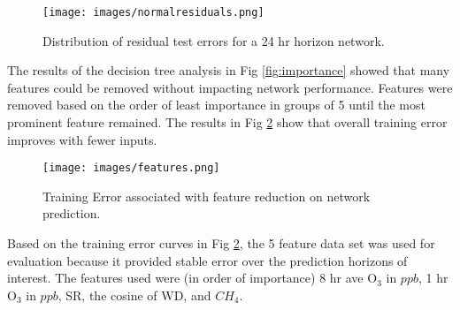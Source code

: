 %
\begin{figure}[!htb]
\centering
\texttt{[image: images/normalresiduals.png]}
\caption{Distribution of residual test errors for a 24 hr horizon network.}
\label{fig:normalresiduals}
\end{figure}
%

The results of the decision tree analysis in Fig \ref{fig:importance} showed that many features could be removed without impacting network performance. Features were removed based on the order of least importance in groups of 5 until the most prominent feature remained. The results in Fig \ref{fig:features} show that overall training error improves with fewer inputs.
%
\begin{figure}[!htb]
\centering
\texttt{[image: images/features.png]}
\caption{Training Error associated with feature reduction on network prediction.}
\label{fig:features}
\end{figure}
%
Based on the training error curves in Fig \ref{fig:features}, the 5 feature data set was used for evaluation because it provided stable error over the prediction horizons of interest. The features used were (in order of importance) 8 hr ave O$_{3}$ in $ppb$, 1 hr O$_{3}$ in $ppb$, SR, the cosine of WD, and $CH_{4}$.

